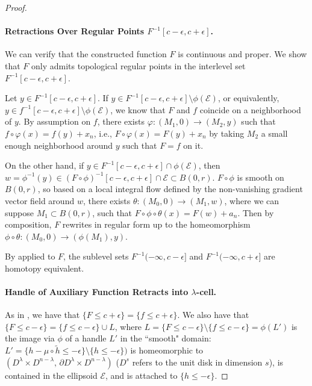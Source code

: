 \documentclass[11pt]{article}
\newcommand{\eps}{\epsilon}
\newcommand{\bord}{\partial}
\newcommand{\inter}{\cap}
\newcommand{\union}{\cup}
\theoremstyle{plain}
\theoremstyle{definition}
\theoremstyle{remark}
\begin{document}
\begin{proof}
\paragraph{Retractions Over Regular Points $F^{-1}[c-\eps,c+\eps]$. }
We can verify that the constructed function $F$ is continuous and proper.  We show that $F$ only admits topological regular points in the interlevel set $F^{-1}[c-\eps,c+\eps]$.

Let $y \in F^{-1}[c-\eps,c+\eps]$. 
If $y \in F^{-1}[c-\eps,c+\eps] \setminus \phi(\mathcal{E})$, or equivalently, $y \in f^{-1}[c-\eps,c+\eps] \setminus \phi(\mathcal{E})$, we know that $F$ and $f$ coincide on a neighborhood of $y$. By assumption on $f$, there exists $\varphi : (M_1, 0) \to (M_2, y)$ such that $f \circ \varphi(x) = f(y) + x_n$, i.e., $F \circ \varphi(x) = F(y) + x_n$ by taking $M_2$ a small enough neighborhood around $y$ such that $F = f$ on it.

On the other hand, if $y \in F^{-1}[c-\eps,c+\eps] \inter \phi(\mathcal{E})$, then $w = \phi^{-1}(y) \in (F \circ \phi)^{-1}[c-\eps,c+\eps] \inter \mathcal{E} \subset B(0,r)$. $F \circ \phi$ is smooth on $B(0,r)$, so based on a local integral flow defined by the non-vanishing gradient vector field around $w$,
there exists $\theta : (M_0, 0) \to (M_1, w)$, where we can suppose $M_1 \subset B(0,r)$, such that $F \circ \phi \circ \theta(x) = F(w) + a_n$. Then by composition, $F$ rewrites in regular form up to the homeomorphism $\phi \circ \theta : (M_0, 0) \to (\phi(M_1),y)$.

By  applied to $F$, the sublevel sets $F^{-1}(-\infty, c-\eps]$ and $F^{-1}(-\infty, c+\eps]$ are homotopy equivalent.

\paragraph{Handle of Auxiliary Function Retracts into $\lambda$-cell.}

As in \cite{milnor_morse_1963}, we have that $\{F \leq c + \eps\} = \{f \leq c + \eps\}$. We also have that $\{F \leq c - \eps\} = \{f \leq c - \eps\} \union L$, where $L = \{F \leq c - \eps\} \setminus \{f \leq c - \eps\} = \phi(L')$ is the image via $\phi$ of a handle $L'$ in the ``smooth" domain: $L' = \{h - \mu \circ \widetilde{h} \leq -\eps \} \setminus \{h \leq -\eps\})$ is homeomorphic to $(D^\lambda \times D^{n - \lambda},\, \bord D^\lambda \times D^{n - \lambda})$ ($D^s$ refers to the unit disk in dimension $s$), is contained in the ellipsoid $\mathcal{E}$, and is attached to $\{h \leq - \eps\}$.


\end{proof}
\end{document}
